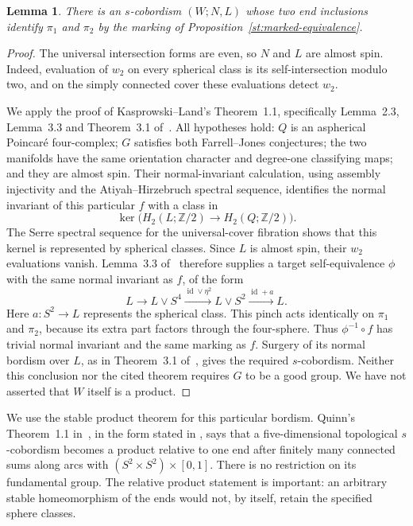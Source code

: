 \documentclass[11pt]{article}
\newtheorem{lemma}[theorem]{Lemma}
\theoremstyle{definition}
\theoremstyle{remark}
\newcommand{\Z}{\mathbb Z}
\begin{document}
\begin{lemma}\label{st:marked-bordism}
There is an $s$-cobordism $(W;N,L)$ whose two end inclusions identify
$\pi_1$ and $\pi_2$ by the marking of
Proposition~\ref{st:marked-equivalence}.
\end{lemma}

\begin{proof}
The universal intersection forms are even, so $N$ and $L$ are almost
spin.  Indeed, evaluation of $w_2$ on every spherical class is its
self-intersection modulo two, and on the simply connected cover these
evaluations detect $w_2$.

We apply the proof of Kasprowski--Land's Theorem~1.1, specifically
Lemma~2.3, Lemma~3.3 and Theorem~3.1 of~\cite{KL}.  All hypotheses hold:
$Q$ is an aspherical Poincar\'e four-complex; $G$ satisfies both
Farrell--Jones conjectures; the two manifolds have the same orientation
character and degree-one classifying maps; and they are almost spin.
Their normal-invariant calculation, using assembly injectivity and the
Atiyah--Hirzebruch spectral sequence, identifies the normal invariant of
this particular $f$ with a class in
\[
 \ker\bigl(H_2(L;\Z/2)\longrightarrow H_2(Q;\Z/2)\bigr).
\]
The Serre spectral sequence for the universal-cover fibration shows
that this kernel is represented by spherical classes. Since $L$ is
almost spin, their $w_2$ evaluations vanish. Lemma~3.3 of~\cite{KL}
therefore supplies a target self-equivalence $\phi$ with the same
normal invariant as $f$, of the form
\[
 L\longrightarrow L\vee S^4
 \xrightarrow{\operatorname{id}\vee\eta^2}L\vee S^2
 \xrightarrow{\operatorname{id}+a}L.
\]
Here $a:S^2\to L$ represents the spherical class. This pinch acts
identically on $\pi_1$ and $\pi_2$, because its extra part factors through
the four-sphere. Thus $\phi^{-1}\circ f$ has trivial normal invariant
and the same marking as $f$. Surgery of its normal bordism over $L$,
as in Theorem~3.1 of~\cite{KL}, gives the required $s$-cobordism.
Neither this conclusion nor
the cited theorem requires $G$ to be a good group.  We have not asserted
that $W$ itself is a product.
\end{proof}

We use the stable product theorem for this particular bordism.  Quinn's
Theorem~1.1 in~\cite{QuinnStable}, in the form stated in
\cite[Remark~3.7]{KPR}, says that a five-dimensional topological
$s$-cobordism becomes a product relative to one end after finitely many
connected sums along arcs with $(S^2\times S^2)\times[0,1]$.
There is no restriction on its fundamental group.  The relative product
statement is important: an arbitrary stable homeomorphism of the ends
would not, by itself, retain the specified sphere classes.
\end{document}
